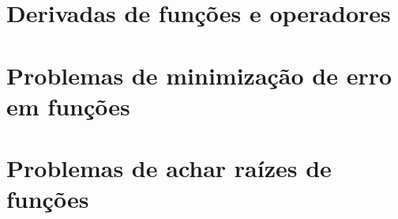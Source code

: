 \documentclass[11pt,fleqn]{book} %
\begin{document}

\part{Derivadas de funções e operadores}
%






\part{Problemas de minimização de erro em funções}








\part{Problemas de achar raízes de funções}

\end{document}
